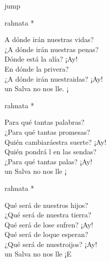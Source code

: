 \begin{cancion}jump\\
	\begin{chorus}%
		rahnata *\jump\\
	\end{chorus}%
	A dónde irán nuestras vidas?\\
	\jump
¿A dónde irán nuestras penas?\\
	Dónde está la alía? ¡Ay!\\
	En dónde la privera?\\
	¿A dónde irán nuestraidas? ¡Ay!\\
	 un Salva no nos lle. ¡\jump\\
	\begin{chorus}%
		rahnata *\jump\\
	\end{chorus}%
	Para qué tantas palabras?\\
	\jump
¿Para qué tantas promesas?\\
	Quién cambiaráestra suerte? ¡Ay! \\
	Quién pondrá l en las sendas?\\
	¿Para qué tantas palas? ¡Ay!\\
	 un Salva no nos lle ¡\jump\\
	\begin{chorus}%
		rahnata *\jump\\
	\end{chorus}%
	Qué será de nuestros hijos?\\
	\jump
¿Qué será de nuestra tierra?\\
	Qué será de lose sufren? ¡Ay!\\
	Qué será de loque esperan?\\
	¿Qué será de nuestroijos? ¡Ay!\\
	 un Salva no nos lle ¡E\jump\\
	\begin{chorus}%

\end{chorus}
\end{cancion}
